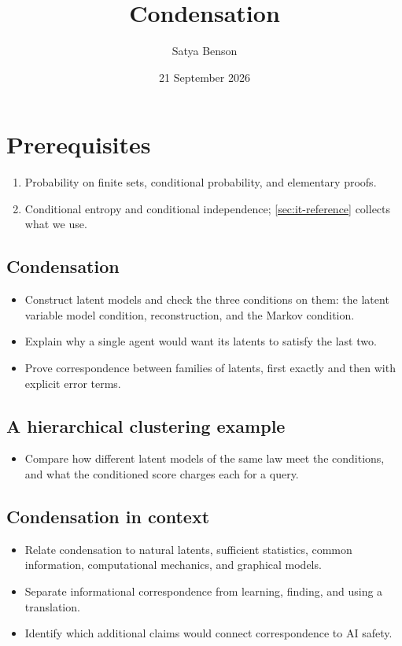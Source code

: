 \documentclass[11pt]{article}
\title{Condensation}
\author{Satya Benson}
\date{21 September 2026}
\begin{document}
\maketitle


\section{Prerequisites}
\label{sec:prerequisites}
\begin{enumerate}
\item Probability on finite sets, conditional probability, and elementary proofs.
\item Conditional entropy and conditional independence;
\cref{sec:it-reference} collects what we use.
\end{enumerate}


\begin{learningoutcomes}
\subsection*{Condensation}
\begin{itemize}
\item Construct latent models and check the three conditions on them: the
latent variable model condition, reconstruction, and the Markov condition.
\item Explain why a single agent would want its latents to satisfy the last two.
\item Prove correspondence between families of latents, first exactly and
then with explicit error terms.
\end{itemize}
\subsection*{A hierarchical clustering example}
\begin{itemize}
\item Compare how different latent models of the same law meet the conditions,
and what the conditioned score charges each for a query.
\end{itemize}
\subsection*{Condensation in context}
\begin{itemize}
\item Relate condensation to natural latents, sufficient statistics, common
information, computational mechanics, and graphical models.
\item Separate informational correspondence from learning, finding, and using
a translation.
\item Identify which additional claims would connect correspondence to AI safety.
\end{itemize}
\end{learningoutcomes}
\end{document}
